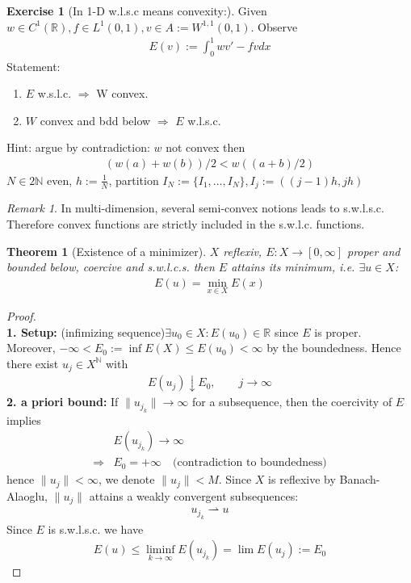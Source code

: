 \documentclass[a4paper,12pt,oneside,fleqn]{book}
\newtheorem{theorem}{Theorem}[section]
\theoremstyle{definition}
\newtheorem{exercise}{Exercise}[chapter]
\theoremstyle{remark}
\newtheorem*{remark}{Remark}
\begin{document}
\begin{exercise}[In 1-D w.l.s.c means convexity:]
	Given $w \in C^1(\mathbb{R}), f \in L^1(0, 1), v \in A:= W^{1, 1}(0, 1) $. Observe
	\begin{align*}
		E(v):= \int_0^1 w v' - fv dx
	\end{align*}
	Statement:
	\begin{enumerate}
		\item $E$ w.s.l.c. $\Rightarrow$ W convex.
		\item $W$ convex and bdd below $\Rightarrow$ $E$ w.l.s.c.
	\end{enumerate}
	Hint: argue by contradiction: $w$ not convex then 
	\begin{align*}
		(w(a) + w(b))\slash 2 < w((a + b)\slash 2)
	\end{align*}
	$N \in 2 \mathbb{N}$ even, $h := \frac{1}{N}$, partition $I_N:=\{I_1, \dots, I_N\}, I_j:= ((j - 1)h, jh)$
\end{exercise}
\begin{remark}
In multi-dimension, several semi-convex notions leads to s.w.l.s.c.	Therefore convex functions are strictly included in the s.w.l.c. functions. 
\end{remark}

\begin{theorem}[Existence of a minimizer]
$X$ reflexiv, $E: X \rightarrow [0, \infty]$ proper and bounded below, coercive and s.w.l.c.s. then $E$ attains its minimum, i.e. $\exists u \in X$:
\begin{align*}
	E(u) = \min_{x \in X} E(x)
\end{align*}
\end{theorem}
\begin{proof}
	\quad\\
	\textbf{1. Setup:} (infimizing sequence)$\exists u_0 \in X: E(u_0) \in \mathbb{R}$ since $E$ is proper. Moreover,  $- \infty<  E_0:= \inf E(X) \le E(u_0) < \infty$ by the boundedness. Hence there exist $u_j \in X^\mathbb{N}$ with 
	\begin{align*}
		E(u_j) \downarrow E_0, \qquad j \rightarrow \infty
	\end{align*}
	\textbf{2. a priori bound:} If $\|u_{j_k}\| \rightarrow \infty$ for a subsequence, then the coercivity of $E$ implies 
	\begin{align*}
		&E(u_{j_k}) \rightarrow \infty\\
		 \Rightarrow &E_0 = + \infty \quad\text{(contradiction to boundedness)}
	\end{align*}
	hence $\|u_j\|< \infty$, we denote $\|u_j\| < M$. Since $X$ is reflexive by Banach-Alaoglu, $\|u_j\|$ attains a weakly convergent subsequences:
	\begin{align*}
		u_{j_k} \rightharpoonup u 
	\end{align*}
	Since $E$ is s.w.l.s.c. we have
	\begin{align*}
		E(u) \le \liminf_{k \rightarrow \infty} E(u_{j_k}) = \lim E(u_j) := E_0
	\end{align*}
\end{proof}
\end{document}
